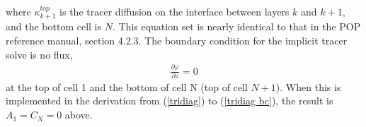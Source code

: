 \documentclass[11pt]{report}
\begin{document}
where $\kappa^{top}_{k+1}$ is the tracer diffusion on the interface between layers $k$ and $k+1$, and the bottom cell is $N$.  This equation set is nearly identical to that in the POP reference manual, section 4.2.3.  The boundary condition for the implicit tracer solve is no flux, 
\begin{eqnarray}
\label{tridiag bc}
\frac{\partial \varphi}{\partial z} = 0
\end{eqnarray}
at the top of cell 1 and the bottom of cell N (top of cell $N+1$).  When this is implemented in the derivation from (\ref{tridiag}) to (\ref{tridiag bc}), the result is $A_1=C_N=0$ above.
\end{document}
